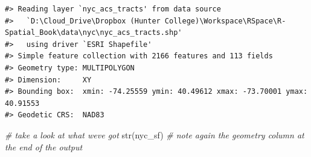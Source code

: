 \documentclass[
  11pt,
]{book}
\newenvironment{Shaded}{\begin{snugshade}}{\end{snugshade}}
\newcommand{\CommentTok}[1]{\textcolor[rgb]{0.56,0.35,0.01}{\textit{#1}}}
\newcommand{\FunctionTok}[1]{\textcolor[rgb]{0.00,0.00,0.00}{#1}}
\newcommand{\NormalTok}[1]{#1}
\begin{document}
\begin{verbatim}
#> Reading layer `nyc_acs_tracts' from data source 
#>   `D:\Cloud_Drive\Dropbox (Hunter College)\Workspace\RSpace\R-Spatial_Book\data\nyc\nyc_acs_tracts.shp' 
#>   using driver `ESRI Shapefile'
#> Simple feature collection with 2166 features and 113 fields
#> Geometry type: MULTIPOLYGON
#> Dimension:     XY
#> Bounding box:  xmin: -74.25559 ymin: 40.49612 xmax: -73.70001 ymax: 40.91553
#> Geodetic CRS:  NAD83
\end{verbatim}

\begin{Shaded}
\begin{Highlighting}[]
\CommentTok{\# take a look at what we\textquotesingle{}ve got}
\FunctionTok{str}\NormalTok{(nyc\_sf) }\CommentTok{\# note again the geometry column at the end of the output}
\end{Highlighting}
\end{Shaded}
\end{document}
